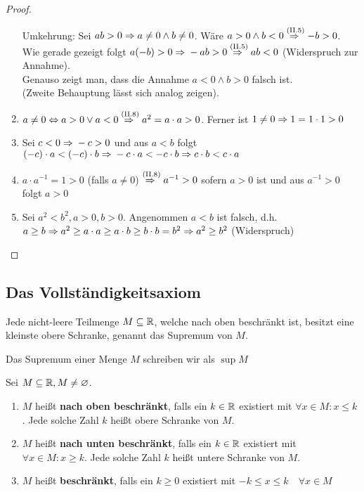 \begin{satz}
\begin{proof}
\begin{enumerate}[label=(II.\arabic*)]
            Umkehrung: Sei $ab>0 \Rightarrow{} a\neq 0 \land b \neq 0$. Wäre $a>0 \land b < 0 \overset{\text{(II.5)}}{\Rightarrow{}} -b>0$. Wie gerade gezeigt folgt $a(-b) > 0 \Rightarrow{} -ab > 0 \overset{\text{(II.5)}}{\Rightarrow{}} ab < 0$ (Widerspruch zur Annahme).\\
            Genauso zeigt man, dass die Annahme $a<0 \land b > 0$ falsch ist.\\
            (Zweite Behauptung lässt sich analog zeigen).
            \item $a\neq 0 \Leftrightarrow{} a > 0 \lor a < 0 \overset{\text{(II.8)}}{\Rightarrow{}} a^2 = a \cdot a > 0$. Ferner ist $1\neq 0 \Rightarrow{} 1=1\cdot 1 > 0$
            \item Sei $c<0 \Rightarrow{} -c > 0$ und aus $a<b$ folgt $(-c)\cdot a < (-c)\cdot b \Rightarrow{} -c\cdot a < -c\cdot b \Rightarrow{} c\cdot b < c\cdot a$
            \item $a\cdot a^{-1} = 1 > 0$ (falls $a\neq 0$) $\overset{\text{(II.8)}}{\Rightarrow{}} a^{-1} > 0$ sofern $a>0$ ist und aus $a^{-1}>0$ folgt $a>0$
            \item Sei $a^{2}<b^2, a>0, b>0$. Angenommen $a<b$ ist falsch, d.h. $a\geq b \Rightarrow{} a^{2} \geq a \cdot a \geq a\cdot b\geq b\cdot b = b^{2}\Rightarrow{} a^{2}\geq b^{2}$ (Widerspruch)
        \end{enumerate}
    \end{proof}
\end{satz}

\newpage

\subsection{Das Vollständigkeitsaxiom}

\begin{axiom}[Vollständigkeitsaxiom]
    Jede nicht-leere Teilmenge $M\subseteq \mathbb{R}$, welche nach oben beschränkt ist, besitzt eine kleinste obere Schranke, genannt das Supremum von $M$.
\end{axiom}

\begin{notation}[Supremum]
    Das Supremum einer Menge $M$ schreiben wir als $\sup M$
\end{notation}

\begin{definition}
    Sei $M\subseteq \mathbb{R}, M\neq \varnothing$.
    \begin{enumerate}[label=(\roman*)]
        \item $M$ heißt \textbf{nach oben beschränkt}, falls ein $k\in\mathbb{R}$ existiert mit $\forall x\in M:x\leq k$.
        Jede solche Zahl $k$ heißt obere Schranke von $M$.
        \item $M$ heißt \textbf{nach unten beschränkt}, falls ein $k\in\mathbb{R}$ existiert mit $\forall x\in M:x\geq k$.
        Jede solche Zahl $k$ heißt untere Schranke von $M$.
        \item $M$ heißt \textbf{beschränkt}, falls ein $k\geq 0$ existiert mit $-k\leq x \leq k\quad \forall x\in M$
    \end{enumerate}
\end{definition}


